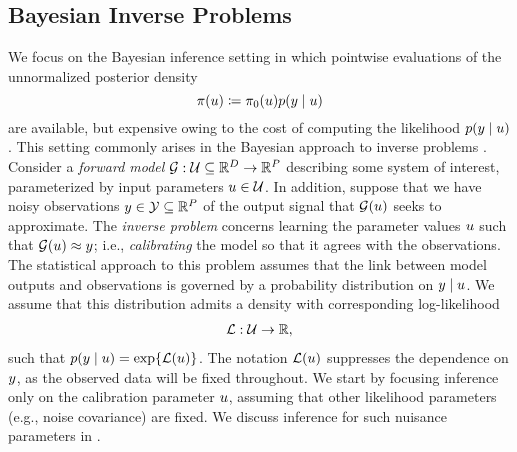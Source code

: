 \documentclass[12pt]{article}
\begin{document}
 \subsection{Bayesian Inverse Problems}
We focus on the Bayesian inference setting in which pointwise evaluations of the unnormalized posterior
density 
\begin{equation}
\pi(u) \coloneqq \pi_0(u) p(y \mid u) \label{post_dens_generic}
\end{equation}
are available, but expensive owing to the cost of computing the likelihood $p(y \mid u)$. This setting 
commonly arises in the Bayesian approach to inverse problems \citep{Stuart_BIP}. 
Consider a \textit{forward model} $\mathcal{G}: \mathcal{U} \subseteq \mathbb{R}^{D} \to \mathbb{R}^{P}$ describing 
some system of interest, parameterized by input parameters $u \in \mathcal{U}$. In addition, suppose that 
we have noisy observations $y \in \mathcal{Y} \subseteq \mathbb{R}^{P}$ of the output signal that $\mathcal{G}(u)$ 
seeks to approximate. The \textit{inverse problem} concerns learning the parameter values $u$ such
 that $\mathcal{G}(u) \approx y$; i.e., \textit{calibrating} the model so that it agrees with the observations. 
 The statistical approach to this problem assumes that the link between model outputs and 
observations is governed by a probability distribution on $y \mid u$. We assume that this distribution 
admits a density with corresponding log-likelihood 
\begin{align}
\mathcal{L}: \mathcal{U} \to \mathbb{R}, \label{log_likelihood}
\end{align}
such that $p(y \mid u) = \exp\mathopen{}\left\{\mathcal{L}(u)\right\}\mathclose{}$. The notation $\mathcal{L}(u)$ suppresses the dependence 
on $y$, as the observed data will be fixed throughout. We start by focusing inference only on the 
calibration parameter $u$, assuming that other likelihood parameters (e.g., noise covariance) 
are fixed. We discuss inference for such nuisance parameters in .
\end{document}

